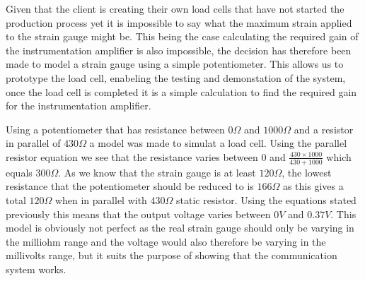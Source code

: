 Given that the client is creating their own load cells that have not started the production process yet it is impossible to say what the maximum strain applied to the strain gauge might be. This being the case calculating the required gain of the instrumentation amplifier is also impossible, the decision has therefore been made to model a strain gauge using a simple potentiometer. This allows us to prototype the load cell, enabeling the testing and demonstation of the system, once the load cell is completed it is a simple calculation to find the required gain for the instrumentation amplifier. 

Using a potentiometer that has resistance between $0\Omega$ and $1000\Omega$ and a resistor in parallel of $430\Omega$ a model was made to simulat a load cell. Using the parallel resistor equation we see that the resistance varies between $0$ and $\frac{430 \times 1000}{430 + 1000}$  which equals $300\Omega$. As we know that the strain gauge is at least $120\Omega$, the lowest resistance that the potentiometer should be reduced to is $166\Omega$ as this gives a total $120\Omega$ when in parallel with $430\Omega$ static resistor. Using the equations stated previously this means that the output voltage varies between $0V$ and $0.37V$. This model is obviously not perfect as the real strain gauge should only be varying in the milliohm range and the voltage would also therefore be varying in the millivolts range, but it suits the purpose of showing that the communication system works. 
